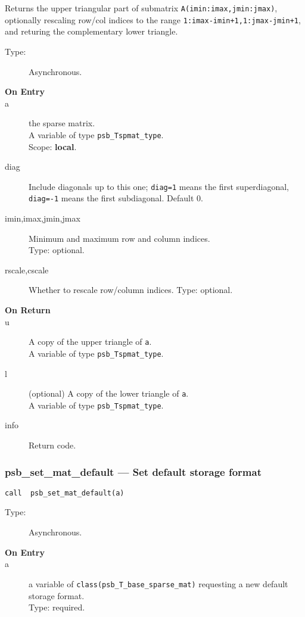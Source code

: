 Returns the upper triangular part of submatrix
\verb|A(imin:imax,jmin:jmax)|, optionally rescaling row/col indices to
the range \verb|1:imax-imin+1,1:jmax-jmin+1|, and returing the
complementary lower triangle. 
\begin{description}
\item[Type:] Asynchronous.
\item[\bf On Entry]
\item[a] the sparse matrix.\\
A variable of type \verb|psb_Tspmat_type|.\\
Scope: {\bf local}.\\
\item[diag] Include diagonals up to this one; \verb|diag=1| means the
  first superdiagonal, \verb|diag=-1| means the first subdiagonal. 
Default 0.
\item[imin,imax,jmin,jmax] Minimum and maximum row and column indices.\\
Type: optional.
\item[rscale,cscale] Whether to rescale row/column indices.
Type: optional.
\end{description}
\begin{description}
\item[\bf On Return]
\item[u]  A copy  of the upper triangle of \verb|a|.\\
A variable of type \verb|psb_Tspmat_type|.
\item[l] (optional) A copy  of the lower triangle of \verb|a|.\\
A variable of type \verb|psb_Tspmat_type|.
\item[info] Return code. 
\end{description}




\subsubsection{psb\_set\_mat\_default --- Set default  storage format}


\begin{verbatim}
call  psb_set_mat_default(a)
\end{verbatim}

\begin{description}
\item[Type:] Asynchronous.
\item[\bf On Entry]
\item[a] a variable of \verb|class(psb_T_base_sparse_mat)|  requesting
  a new default storage format.\\ 
Type: required.
\end{description}






